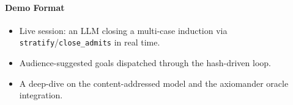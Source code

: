 \documentclass[sigconf,screen]{acmart}
\begin{document}
\paragraph{Demo Format}

\begin{itemize}
\item Live session: an LLM closing a multi-case induction via
\texttt{stratify}/\texttt{close\_admits} in real time.
\item Audience-suggested goals dispatched through the hash-driven loop.
\item A deep-dive on the content-addressed model and the axiomander oracle
integration.
\end{itemize}
\end{document}
